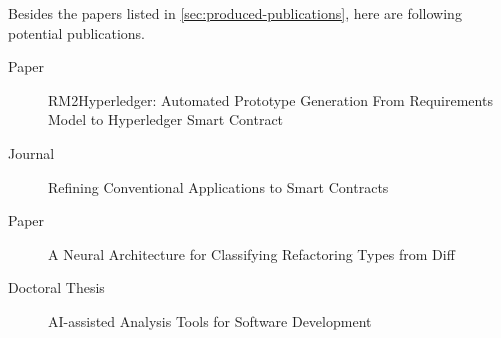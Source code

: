 Besides the papers listed in \autoref{sec:produced-publications}, here are following potential publications.

\begin{description}
\item[Paper] RM2Hyperledger: Automated Prototype Generation From Requirements Model to Hyperledger Smart Contract
\item[Journal] Refining Conventional Applications to Smart Contracts
\item[Paper] A Neural Architecture for Classifying Refactoring Types from Diff
\item[Doctoral Thesis] AI-assisted Analysis Tools for Software Development
\end{description}



